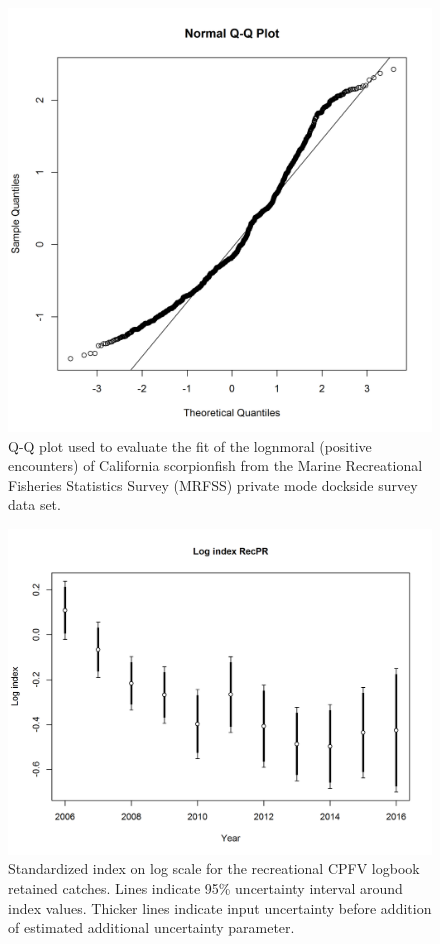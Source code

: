 \documentclass[12pt,]{article}
\begin{document}
\FloatBarrier 

\begin{figure}[htbp]
\centering
\includegraphics{Figures/Fleet4_RecPR_dockside_QQ.png}
\caption{Q-Q plot used to evaluate the fit of the lognmoral (positive
encounters) of California scorpionfish from the Marine Recreational
Fisheries Statistics Survey (MRFSS) private mode dockside survey data
set. \label{fig:Fleet4_RecPR_dockside_QQ}}
\end{figure}

\begin{figure}[htbp]
\centering
\includegraphics{r4ss/plots_mod1/index4_logcpuedata_RecPR.png}
\caption{Standardized index on log scale for the recreational CPFV
logbook retained catches. Lines indicate 95\% uncertainty interval
around index values. Thicker lines indicate input uncertainty before
addition of estimated additional uncertainty parameter.
\label{fig:index4_logcpuedata_RecPR}}
\end{figure}
\end{document}
